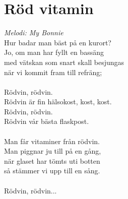 \section{Röd vitamin}
\textit{Melodi: My Bonnie}
\vspace{2mm}\\
Hur badar man bäst på en kurort?\\
Jo, om man har fyllt en bassäng\\
med vätskan som snart skall besjungas\\
när vi kommit fram till refräng;\\
\\
Rödvin, rödvin.\\
Rödvin är fin hälsokost, kost, kost.\\
Rödvin, rödvin.\\
Rödvin vår bästa flaskpost.\\
\\
Man får vitaminer från rödvin.\\
Man piggnar ju till på en gång,\\
när glaset har tömts uti botten\\
så stämmer vi upp till en sång.\\
\\
Rödvin, rödvin...
